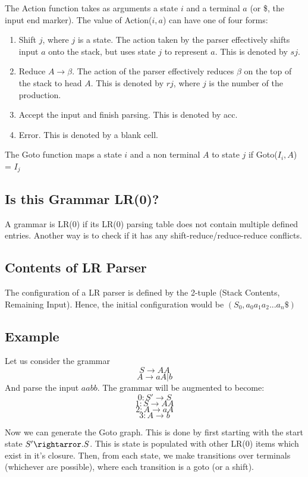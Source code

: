 \documentclass[12pt,letterpaper]{amsbook}
\theoremstyle{definition}
\begin{document}
The Action function takes as arguments a state $i$ and a terminal $a$ (or \$, the input end marker). The value of Action($i,a$) can have one of four forms:
\begin{enumerate}
  \item Shift $j$, where $j$ is a state. The action taken by the parser effectively shifts input $a$ onto the stack, but uses state $j$ to represent $a$. This is denoted by $sj$.
  \item Reduce $A \rightarrow \beta$. The action of the parser effectively reduces $\beta$ on the top of the stack to head $A$. This is denoted by $rj$, where $j$ is the number of the production.
  \item Accept the input and finish parsing. This is denoted by acc.
  \item Error. This is denoted by a blank cell.
\end{enumerate}

The Goto function maps a state $i$ and a non terminal $A$ to state $j$ if Goto($I_i,A$) = $I_j$

\subsection{Is this Grammar LR(0)?} 

A grammar is LR(0) if its LR(0) parsing table does not contain multiple defined entries. Another way is to check if it has any shift-reduce/reduce-reduce conflicts.

\subsection{Contents of LR Parser}

The configuration of a LR parser is defined by the 2-tuple (Stack Contents, Remaining Input). Hence, the initial configuration would be $(S_0,a_0a_1a_2...a_n\$)$

\subsection{Example}

Let us consider the grammar
\[S \rightarrow AA\]
\[A \rightarrow aA|b\]
And parse the input $aabb$. The grammar will be augmented to become:
\[0:S' \rightarrow S\]
\[1:S \rightarrow AA\]
\[2:A \rightarrow aA\]
\[3:A \rightarrow b\]

Now we can generate the Goto graph. This is done by first starting with the start state $S' \rightarror .S$. This is  state is populated with other LR(0) items which exist in it's closure. Then, from each state, we make transitions over terminals (whichever are possible), where each transition is a goto (or a shift).
\end{document}
